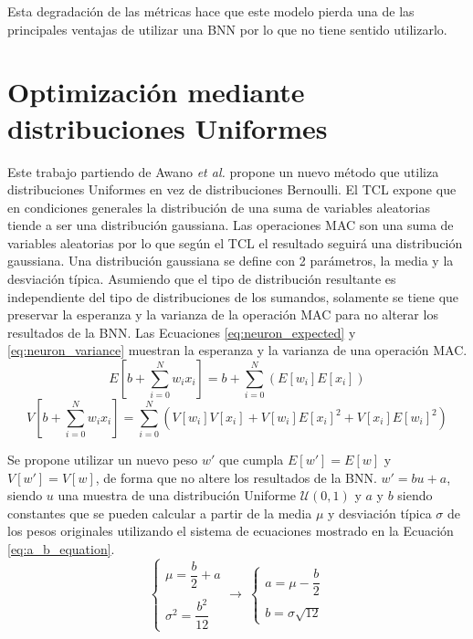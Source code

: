 Esta degradación de las métricas hace que este modelo pierda una de las principales ventajas de utilizar una BNN por lo que no tiene sentido utilizarlo.

\section{Optimización mediante distribuciones Uniformes}

Este trabajo partiendo de Awano \emph{et al.} propone un nuevo método que utiliza distribuciones Uniformes en vez de distribuciones Bernoulli. El TCL expone que en condiciones generales la distribución de una suma de variables aleatorias tiende a ser una distribución gaussiana. Las operaciones MAC son una suma de variables aleatorias por lo que según el TCL el resultado seguirá una distribución gaussiana. Una distribución gaussiana se define con 2 parámetros, la media y la desviación típica. Asumiendo que el tipo de distribución resultante es independiente del tipo de distribuciones de los sumandos, solamente se tiene que preservar la esperanza y la varianza de la operación MAC para no alterar los resultados de la BNN. Las Ecuaciones \ref{eq:neuron_expected}  y \ref{eq:neuron_variance} muestran la esperanza y la varianza de una operación MAC.
\begin{equation} \label{eq:neuron_expected}
E\left[ b + \sum_{i=0}^N w_i x_i \right]  = b + \sum_{i=0}^N ( E[w_i] E[x_i] )
\end{equation}
\begin{equation} \label{eq:neuron_variance}
V\left[ b + \sum_{i=0}^N w_i x_i \right] = \sum_{i=0}^N ( V[w_i]V[x_i] + V[w_i]E[x_i]^2 + V[x_i]E[w_i]^2 )
\end{equation}

Se propone utilizar un nuevo peso $w'$ que cumpla $E[w'] = E[w]$ y $V[w'] = V[w]$, de forma que no altere los resultados de la BNN. $w' = bu + a$, siendo $u$ una muestra de una distribución Uniforme $\mathcal{U}(0,1)$ y $a$ y $b$ siendo constantes que se pueden calcular a partir de la media $\mu$ y desviación típica $\sigma$ de los pesos originales utilizando el sistema de ecuaciones mostrado en la Ecuación \ref{eq:a_b_equation}.
\begin{equation}\label{eq:a_b_equation}
\begin{cases}
\mu = \dfrac{b}{2} + a\\ \\
\sigma^2 = \dfrac{b^2}{12}
\end{cases}
\rightarrow\ 
\begin{cases}
a = \mu - \dfrac{b}{2}\\ \\
b = \sigma \sqrt{12}
\end{cases}
\end{equation}

